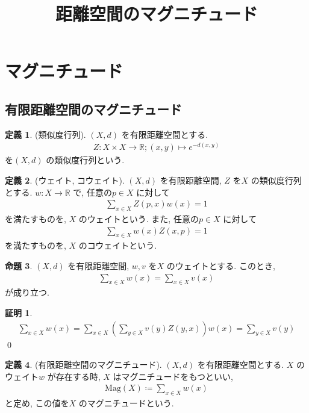 \documentclass[10pt, fleqn, label-section=none]{bxjsarticle}
\title{距離空間のマグニチュード}
\date{}
\author{}
\theoremstyle{definition}
\newtheorem{dfn}{定義}[section]
\newtheorem{prop}[dfn]{命題}
\newtheorem*{pf*}{証明}
\renewcommand{\;}{\, ; \,}
\newcommand{\Mag}{\textrm{Mag}}
\begin{document}
\maketitle

\section{マグニチュード}

\subsection{有限距離空間のマグニチュード}

\begin{dfn}(類似度行列). $(X, d)$ を有限距離空間とする.
\begin{align*} Z: X \times X \rightarrow \mathbb R; (x, y) \mapsto e^{-d(x,y)}\end{align*}
を$(X, d)$ の類似度行列という. 
\end{dfn}


\begin{dfn}(ウェイト, コウェイト). $(X, d)$ を有限距離空間, $Z$ を$X$ の類似度行列とする. $w: X \rightarrow \mathbb R$ で, 任意の$p \in X$ に対して
\begin{align*} \sum_{x \in X }Z(p, x) w(x) = 1 \end{align*}
を満たすものを, $X$ のウェイトという. また, 任意の$p \in X$ に対して
\begin{align*} \sum_{x \in X}w(x) Z(x, p) = 1 \end{align*}
を満たすものを, $X$ のコウェイトという. 
\end{dfn}

\begin{prop}$(X, d)$ を有限距離空間, $w, v$ を$X$ のウェイトとする. このとき, 
\begin{align*} \sum_{x \in X} w(x) = \sum_{x \in X} v(x)\end{align*}
が成り立つ. 
\end{prop}
\begin{pf*}
\begin{align*} \sum_{x \in X} w(x) = \sum_{x \in X}(\sum_{y \in X}v(y)Z(y, x)) w(x) = \sum_{y \in X} v(y) \end{align*}
\qed
\end{pf*}


\begin{dfn}(有限距離空間のマグニチュード). $(X, d)$ を有限距離空間とする. $X$ のウェイト$w$ が存在する時, $X$ はマグニチュードをもつといい, 
\begin{align*} \Mag(X) \coloneqq \sum_{x \in X } w(x)   \end{align*}
と定め, この値を$X$ のマグニチュードという. 
\end{dfn}
\end{document}
